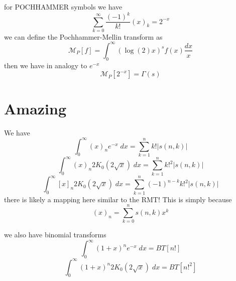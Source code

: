 \documentclass{article}
\begin{document}
for POCHHAMMER symbols we have 
$$
\sum_{k=0}^\infty \frac{(-1)^k}{k!} (x)_k = 2^{-x}
$$
we can define the Pochhammer-Mellin transform as 
$$
\mathcal{M}_P[f] = \int_0^\infty (\log(2) x)^s f(x) \frac{dx}{x}
$$
then we have in analogy to $e^{-x}$
$$
\mathcal{M}_P[2^{-x}] = \Gamma(s)
$$


\section{Amazing}
We have
$$
\int_0^\infty (x)_n e^{-x} \; dx = \sum_{k=1}^n k! |s(n,k)|
$$
$$
\int_0^\infty (x)_n 2 K_0(2 \sqrt{x}) \; dx = \sum_{k=1}^n k!^2 |s(n,k)|
$$
$$
\int_0^\infty [x]_n 2 K_0(2 \sqrt{x}) \; dx = \sum_{k=1}^n (-1)^{n-k} k!^2 |s(n,k)|
$$
there is likely a mapping here similar to the RMT! This is simply because
$$
(x)_n = \sum_{k=0}^n s(n,k) x^k
$$

we also have  binomial transforms
\begin{equation}
\int_0^\infty (1+x)^n e^{-x} \; dx = BT[n!]
\end{equation}
\begin{equation}
\int_0^\infty (1+x)^n 2 K_0(2 \sqrt{x}) \; dx = BT[n!^2]
\end{equation}
\end{document}
